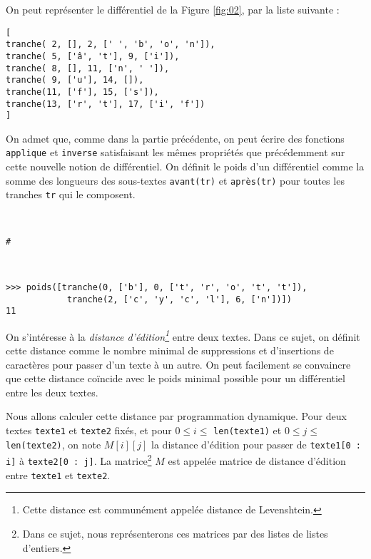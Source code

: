 On peut représenter le différentiel de la Figure \ref{fig:02}, par la liste suivante :
\begin{lstlisting}
[
tranche( 2, [], 2, [' ', 'b', 'o', 'n']),
tranche( 5, ['â', 't'], 9, ['i']),
tranche( 8, [], 11, ['n', ' ']),
tranche( 9, ['u'], 14, []),
tranche(11, ['f'], 15, ['s']),
tranche(13, ['r', 't'], 17, ['i', 'f'])
]
\end{lstlisting}

On admet que, comme dans la partie précédente, on peut écrire des fonctions \lstinline{applique}
et \lstinline{inverse} satisfaisant les mêmes propriétés que précédemment sur cette nouvelle notion de
différentiel. On définit le poids d'un différentiel comme la somme des longueurs des sous-textes
\lstinline{avant(tr)} et \lstinline{après(tr)} pour toutes les tranches \lstinline{tr} qui le composent.

\ifprof
\begin{corrige}~\\ 
\vspace{-.5cm}
\begin{lstlisting}
#
\end{lstlisting}
\end{corrige}
\else
\fi


\begin{exemple}~\\ 
\vspace{-.5cm}
\begin{lstlisting}
>>> poids([tranche(0, ['b'], 0, ['t', 'r', 'o', 't', 't']),
            tranche(2, ['c', 'y', 'c', 'l'], 6, ['n'])])
11
\end{lstlisting}
\end{exemple}

On s'intéresse à la \textit{distance d'édition\footnote{Cette distance est communément appelée distance de Levenshtein.}} entre deux textes. Dans ce sujet, on définit cette
distance comme le nombre minimal de suppressions et d'insertions de caractères pour passer
d'un texte à un autre. On peut facilement se convaincre que cette distance coïncide avec le poids
minimal possible pour un différentiel entre les deux textes.

Nous allons calculer cette distance par programmation dynamique. Pour deux textes \lstinline{texte1}
et \lstinline{texte2} fixés, et pour $0 \leq i \leq $ \lstinline{len(texte1)} et $0 \leq j \leq$ \lstinline{len(texte2)}, on note $M[i][j]$ la distance
d'édition pour passer de \lstinline{texte1[0 : i]} à \lstinline{texte2[0 : j]}. La matrice\footnote{Dans ce sujet, nous représenterons ces matrices par des listes de listes d'entiers.} $M$ est appelée matrice de
distance d'édition entre \lstinline{texte1} et \lstinline{texte2}.

